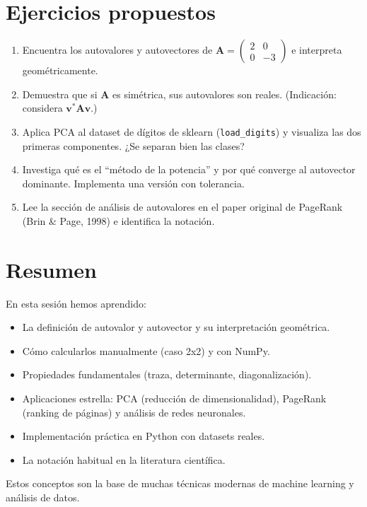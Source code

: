 \documentclass[12pt,a4paper,openany,oneside]{book}
\begin{document}
\section{Ejercicios propuestos}

\begin{enumerate}
    \item Encuentra los autovalores y autovectores de $\mathbf{A} = \begin{pmatrix} 2 & 0 \\ 0 & -3 \end{pmatrix}$ e interpreta geométricamente.
    \item Demuestra que si $\mathbf{A}$ es simétrica, sus autovalores son reales. (Indicación: considera $\mathbf{v}^* \mathbf{A} \mathbf{v}$.)
    \item Aplica PCA al dataset de dígitos de sklearn (\texttt{load\_digits}) y visualiza las dos primeras componentes. ¿Se separan bien las clases?
    \item Investiga qué es el ``método de la potencia'' y por qué converge al autovector dominante. Implementa una versión con tolerancia.
    \item Lee la sección de análisis de autovalores en el paper original de PageRank (Brin \& Page, 1998) e identifica la notación.
\end{enumerate}

\section{Resumen}

En esta sesión hemos aprendido:
\begin{itemize}
    \item La definición de autovalor y autovector y su interpretación geométrica.
    \item Cómo calcularlos manualmente (caso 2x2) y con NumPy.
    \item Propiedades fundamentales (traza, determinante, diagonalización).
    \item Aplicaciones estrella: PCA (reducción de dimensionalidad), PageRank (ranking de páginas) y análisis de redes neuronales.
    \item Implementación práctica en Python con datasets reales.
    \item La notación habitual en la literatura científica.
\end{itemize}
Estos conceptos son la base de muchas técnicas modernas de machine learning y análisis de datos.
\end{document}

